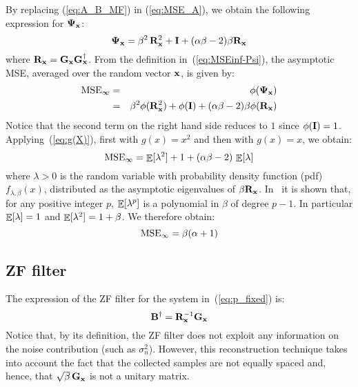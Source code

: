 \documentclass[final, a4paper]{IEEEtran}
\newcommand{\xv}{{\bf x}}
\newcommand{\Bm}{{\bf B}}
\newcommand{\Gm}{{\bf G}}
\newcommand{\Id}{{\bf I}}
\newcommand{\Rm}{{\bf R}}
\newcommand{\Psim}{\hbox{\boldmath$\Psi$}}
\def\non{\nonumber\\}
\def\MSEinf{{\rm MSE}_{\infty}}
\begin{document}
By replacing (\ref{eq:A_B_MF}) in (\ref{eq:MSE_A}), we obtain the following
expression for $\Psim_\xv$:
\begin{equation}
\Psim_\xv = \beta^2\,\Rm_\xv^{2}+\Id+(\alpha\beta-2)\beta\Rm_\xv
\label{eq:MSE_A_MF}
\end{equation}
where $\Rm_\xv=\Gm_\xv\Gm_\xv\Herm$.
From the definition in~(\ref{eq:MSEinf-Psi}), the asymptotic MSE,
averaged over the random vector $\xv$, is given by:
\begin{eqnarray}
\MSEinf
&=& \phi(\Psim_\xv)\non
&=& \beta^2\phi(\Rm_\xv^{2}) +\phi(\Id) +(\alpha\beta-2)\beta\phi(\Rm_\xv) \nonumber
\end{eqnarray}
Notice that the second term on the right hand side reduces to $1$ since $\phi(\Id)=1$.
Applying~(\ref{eq:g(X)}),  first with $g(x)=x^2$ and then with $g(x)=x$, we obtain:
\begin{equation}
\MSEinf = \EE[\lambda^2] + 1 +(\alpha\beta-2)\,\EE[\lambda]
\label{eq:MSEinf_A_MF}
\end{equation}
where $\lambda>0$ is the random variable with probability density function (pdf)
$f_{\lambda,\beta}(x)$, distributed as the asymptotic eigenvalues of $\beta\Rm_\xv$.
 In~\cite{NordioChiasseriniViterbo} it is shown that, for any positive integer $p$,
$\mathop{\mathbb{E}}\limits[\lambda^p]$ is a polynomial in $\beta$ of degree $p-1$.
In particular $\mathop{\mathbb{E}}\limits[\lambda]=1$ and $\mathop{\mathbb{E}}\limits[\lambda^2]=1+\beta$. We therefore obtain:
\begin{equation}
\MSEinf = \beta(\alpha+1)
\label{eq:MSEinf_A_MF2}
\end{equation}



\subsection{ZF filter}
\label{sec:A_ZF}
The expression of the ZF filter for the system in~(\ref{eq:p_fixed}) is:
\begin{equation}
\Bm\Herm = \Rm_\xv^{-1}\Gm_\xv
\label{eq:A_B_ZF}
\end{equation}
Notice that, by its definition, the ZF filter does not exploit any information on the
noise contribution (such as $\sigma^2_n$). However,  this
reconstruction technique
takes into account the fact that the collected samples are not equally spaced and, hence,
that  $\sqrt{\beta}\,\Gm_\xv$ is not a unitary matrix.
\end{document}
